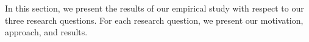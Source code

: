 


In this section, we present the results of our empirical study with respect to our three research questions. For each research question, we present our motivation, approach, and results.



